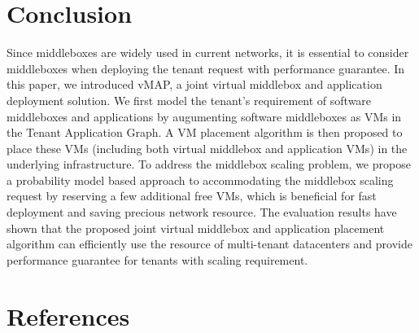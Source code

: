 \documentclass[review]{elsarticle}
\begin{document}
\section{Conclusion}\label{sec:final}
Since middleboxes are widely used in current networks, it is essential to consider middleboxes when deploying the tenant request with performance guarantee. %
In this paper, we introduced vMAP, a joint virtual middlebox and application deployment solution. We first model the tenant's requirement of software middleboxes and applications by augumenting software middleboxes as VMs in the Tenant Application Graph. A VM placement algorithm %
is then proposed to place these VMs (including both virtual middlebox and application VMs) in the underlying infrastructure. 
To address the middlebox scaling problem, we propose a probability model based approach to accommodating the middlebox scaling request by reserving a few additional free VMs, which is beneficial for fast deployment and saving precious network resource.
The evaluation results have shown that the proposed joint virtual middlebox and application placement algorithm can efficiently use the resource of multi-tenant datacenters and provide performance guarantee for tenants with scaling requirement. 

 






%

\section*{References}



\newpage
\end{document}
